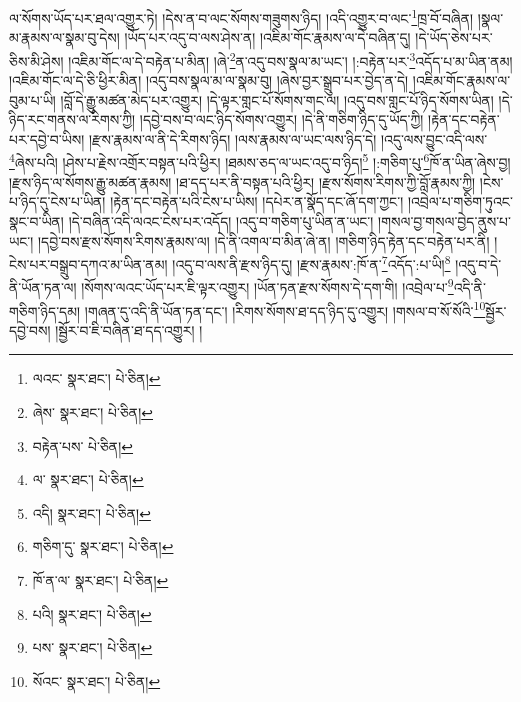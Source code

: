 ལ་སོགས་ཡོད་པར་ཐལ་འགྱུར་ཏེ། །དེས་ན་བ་ལང་སོགས་གཟུགས་ཉིད། །འདི་འགྱུར་བ་ལང་\footnote{ལའང་  སྣར་ཐང་།  པེ་ཅིན། }ཁྲ་བོ་བཞིན། །སྣལ་མ་རྣམས་ལ་སྣམ་བུ་དེས། །ཡོད་པར་འདུ་བ་ལས་ཤེས་ན། །འཇིམ་གོང་རྣམས་ལ་དེ་བཞིན་དུ། །དེ་ཡོད་ཅེས་པར་ཅིས་མི་ཤེས། །འཇིམ་གོང་ལ་དེ་བརྟེན་པ་མིན། །ཞེ་\footnote{ཞེས་  སྣར་ཐང་།  པེ་ཅིན། }ན་འདུ་བས་སྣལ་མ་ཡང་། །:བརྟེན་པར་\footnote{བརྟེན་པས་  པེ་ཅིན། }འདོད་པ་མ་ཡིན་ནམ། །འཇིམ་གོང་ལ་དེ་ཅི་ཕྱིར་མིན། །འདུ་བས་སྣལ་མ་ལ་སྣམ་བུ། །ཞེས་བྱར་སྒྲུབ་པར་བྱེད་ན་དེ། །འཇིམ་གོང་རྣམས་ལ་བུམ་པ་ཡི། །བློ་དེ་རྒྱུ་མཚན་མེད་པར་འགྱུར། །དེ་ལྟར་གླང་པོ་སོགས་གང་ལ། །འདུ་བས་གླང་པོ་ཉིད་སོགས་ཡིན། །དེ་ཉིད་རང་གནས་ལ་རིགས་ཀྱི། །དབྱེ་བས་བ་ལང་ཉིད་སོགས་འགྱུར། །དེ་ནི་གཅིག་ཉིད་དུ་ཡོད་ཀྱི། །རྟེན་དང་བརྟེན་པར་དབྱེ་བ་ཡིས། །རྫས་རྣམས་ལ་ནི་དེ་རིགས་ཉིད། །ལས་རྣམས་ལ་ཡང་ལས་ཉིད་དེ། །འདུ་ལས་བྱུང་འདི་ལས་\footnote{ལ་  སྣར་ཐང་།  པེ་ཅིན། }ཞེས་པའི། །ཤེས་པ་རྗེས་འགྲོར་བསྟན་པའི་ཕྱིར། །ཐམས་ཅད་ལ་ཡང་འདུ་བ་ཉིད།\footnote{འདི།  སྣར་ཐང་།  པེ་ཅིན། } །:གཅིག་པུ་\footnote{གཅིག་དུ་  སྣར་ཐང་།  པེ་ཅིན། }ཁོ་ན་ཡིན་ཞེས་བྱ། །རྫས་ཉིད་ལ་སོགས་རྒྱུ་མཚན་རྣམས། །ཐ་དད་པར་ནི་བསྟན་པའི་ཕྱིར། །རྫས་སོགས་རིགས་ཀྱི་བློ་རྣམས་ཀྱི། །ངེས་པ་ཉིད་དུ་ངེས་པ་ཡིན། །རྟེན་དང་བརྟེན་པའི་ངེས་པ་ཡིས། །དཔེར་ན་སྣོད་དང་ཞོ་དག་ཀྱང་། །འབྲེལ་པ་གཅིག་ཏུའང་སྣང་བ་ཡིན། །དེ་བཞིན་འདི་ལའང་ངེས་པར་འདོད། །འདུ་བ་གཅིག་པུ་ཡིན་ན་ཡང་། །གསལ་བྱ་གསལ་བྱེད་ནུས་པ་ཡང་། །དབྱེ་བས་རྫས་སོགས་རིགས་རྣམས་ལ། །དེ་ནི་འགལ་བ་མིན་ཞེ་ན། །གཅིག་ཉིད་རྟེན་དང་བརྟེན་པར་ནི། །ངེས་པར་བསྒྲུབ་དཀའ་མ་ཡིན་ནམ། །འདུ་བ་ལས་ནི་རྫས་ཉིད་དུ། །རྫས་རྣམས་:ཁོ་ན་\footnote{ཁོ་ན་ལ་  སྣར་ཐང་།  པེ་ཅིན། }འདོད་:པ་ཡི།\footnote{པའི།  སྣར་ཐང་།  པེ་ཅིན། } །འདུ་བ་དེ་ནི་ཡོན་ཏན་ལ། །སོགས་ལའང་ཡོད་པར་ཇི་ལྟར་འགྱུར། །ཡོན་ཏན་རྫས་སོགས་དེ་དག་གི། །འབྲེལ་པ་\footnote{པས་  སྣར་ཐང་།  པེ་ཅིན། }འདི་ནི་གཅིག་ཉིད་དམ། །གཞན་དུ་འདི་ནི་ཡོན་ཏན་དང་། །རིགས་སོགས་ཐ་དད་ཉིད་དུ་འགྱུར། །གསལ་བ་སོ་སོའི་\footnote{སོའང་  སྣར་ཐང་།  པེ་ཅིན། }སྦྱོར་དབྱེ་བས། །སྦྱོར་བ་ཇི་བཞིན་ཐ་དད་འགྱུར། །
